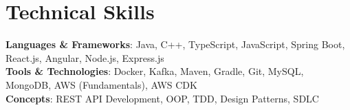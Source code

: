\section{Technical Skills}
\begin{itemize}[leftmargin=0.15in, label={}]
    \small{\item{
        \textbf{Languages \& Frameworks}{: Java, C++, TypeScript, JavaScript, Spring Boot, React.js, Angular, Node.js, Express.js} \\
        \textbf{Tools \& Technologies}{: Docker, Kafka, Maven, Gradle, Git, MySQL, MongoDB, AWS (Fundamentals), AWS CDK} \\
        \textbf{Concepts}{: REST API Development, OOP, TDD, Design Patterns, SDLC}
    }}
\end{itemize}

